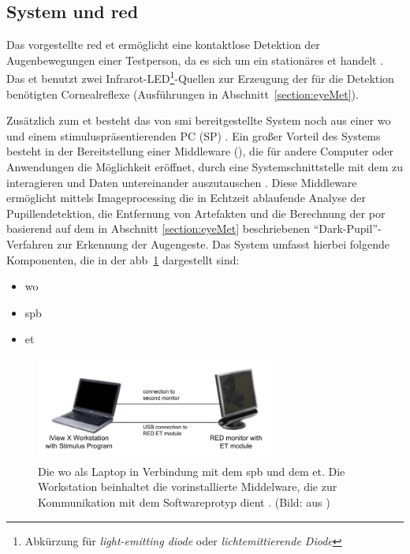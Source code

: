 \subsection{\iV System und \acf{red}}
Das vorgestellte \acs{red} \acl{et} ermöglicht eine kontaktlose Detektion der Augenbewegungen einer Testperson, da es sich um ein stationäres \acs{et} handelt \cite[S.165]{SMI2011}. Das \acs{et} benutzt zwei Infrarot-LED\footnote{Abkürzung für \textit{light-emitting diode} oder \textit{lichtemittierende Diode}}-Quellen zur Erzeugung der für die Detektion benötigten Cornealreflexe \cite[S.22]{SMI2011} (\vgl Ausführungen in Abschnitt~\ref{section:eyeMet}).

Zusätzlich zum \acs{et} besteht das von \acs{smi} bereitgestellte \iV System noch aus einer \acf{wo} und einem stimuluspräsentierenden PC (SP) \cite[S.23]{SMI2011}.
Ein großer Vorteil des \iV Systems besteht in der Bereitstellung einer Middleware (\iV), die für andere Computer oder Anwendungen die Möglichkeit eröffnet, durch eine Systemschnittstelle mit dem \iV zu interagieren und Daten untereinander auszutauschen \cite{SMI2011}. Diese Middleware ermöglicht mittels Imageprocessing die in Echtzeit ablaufende Analyse der Pupillendetektion, die Entfernung von Artefakten und die Berechnung der \acs{por} basierend auf dem in Abschnitt \ref{section:eyeMet} beschriebenen \enquote{Dark-Pupil}-Verfahren zur Erkennung der Augengeste.  
Das \iV System umfasst hierbei folgende Komponenten, die in der \acs{abb}~\ref{fig:eyetracker} dargestellt sind:

\begin{itemize}
\item \iV \acf{wo} 
\item \acf{spb}
\item \acf{et}
\end{itemize}

\begin{figure}[ht]
\begin{center}
\includegraphics[width=0.7\textwidth]{bilder/implementierung/blick.pdf}
\end{center}
\caption{Die \iV \acf{wo} als Laptop in Verbindung mit dem \acf{spb} und dem \acf{et}. Die \iV Workstation beinhaltet die vorinstallierte Middelware, die zur Kommunikation mit dem Softwareprotyp dient \cite{SMI2011}. (Bild: aus \cite[S.143]{SMI2011})}
\label{fig:eyetracker}
\end{figure}


